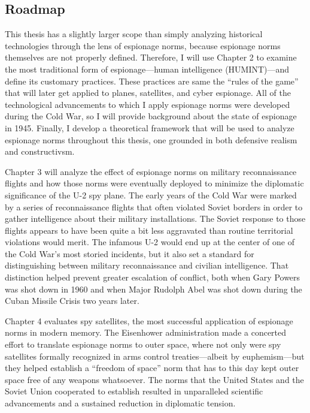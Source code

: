 \documentclass[11pt]{memoir}
\begin{document}
\begin{refsegment}
\subsection{Roadmap}
This thesis has a slightly larger scope than simply analyzing historical technologies through the lens of espionage norms, because espionage norms themselves are not properly defined. Therefore, I will use Chapter 2 to examine the most traditional form of espionage---human intelligence (HUMINT)---and define its customary practices. These practices are same the ``rules of the game'' that will later get applied to planes, satellites, and cyber espionage. All of the technological advancements to which I apply espionage norms were developed during the Cold War, so I will provide background about the state of espionage in 1945. Finally, I develop a theoretical framework that will be used to analyze espionage norms throughout this thesis, one grounded in both defensive realism and constructivsm.

Chapter 3 will analyze the effect of espionage norms on military reconnaissance flights and how those norms were eventually deployed to minimize the diplomatic significance of the U-2 spy plane. The early years of the Cold War were marked by a series of reconnaissance flights that often violated Soviet borders in order to gather intelligence about their military installations. The Soviet response to those flights appears to have been quite a bit less aggravated than routine territorial violations would merit. The infamous U-2 would end up at the center of one of the Cold War's most storied incidents, but it also set a standard for distinguishing between military reconnaissance and civilian intelligence. That distinction helped prevent greater escalation of conflict, both when Gary Powers was shot down in 1960 and when Major Rudolph Abel was shot down during the Cuban Missile Crisis two years later.

Chapter 4 evaluates spy satellites, the most successful application of espionage norms in modern memory. The Eisenhower administration made a concerted effort to translate espionage norms to outer space, where not only were spy satellites formally recognized in arms control treaties---albeit by euphemism---but they helped establish a ``freedom of space'' norm that has to this day kept outer space free of any weapons whatsoever. The norms that the United States and the Soviet Union cooperated to establish resulted in unparalleled scientific advancements and a sustained reduction in diplomatic tension.


\end{refsegment}
\end{document}
